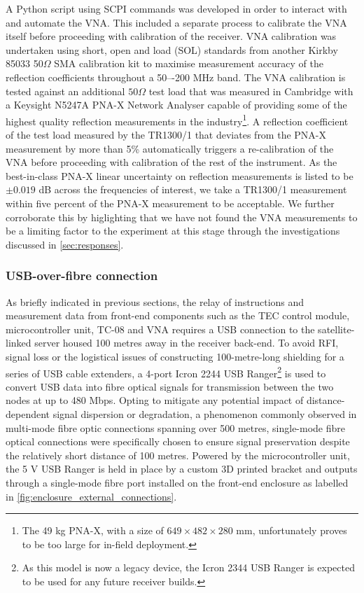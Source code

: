 A Python script using SCPI commands was developed in order to interact with and automate the VNA. This included a separate process to calibrate the VNA itself before proceeding with calibration of the receiver. VNA calibration was undertaken using short, open and load (SOL) standards from another Kirkby 85033 50$\Omega$ SMA calibration kit to maximise measurement accuracy of the reflection coefficients throughout a 50–-200 MHz band. The VNA calibration is tested against an additional $50\Omega$ test load that was measured in Cambridge with a Keysight N5247A PNA-X Network Analyser capable of providing some of the highest quality reflection measurements in the industry\footnote{The 49 kg PNA-X, with a size of $649 \times 482 \times 280$ mm, unfortunately proves to be too large for in-field deployment.}. A reflection coefficient of the test load measured by the TR1300/1 that deviates from the PNA-X measurement by more than 5\% automatically triggers a re-calibration of the VNA before proceeding with calibration of the rest of the instrument. As the best-in-class PNA-X linear uncertainty on reflection measurements is listed to be $\pm 0.019$ dB across the frequencies of interest, we take a TR1300/1 measurement within five percent of the PNA-X measurement to be acceptable. We further corroborate this by higlighting that we have not found the VNA measurements to be a limiting factor to the experiment at this stage through the investigations discussed in \cref{sec:responses}.


\subsubsection{USB-over-fibre connection}
As briefly indicated in previous sections, the relay of instructions and measurement data from front-end components such as the TEC control module, microcontroller unit, TC-08 and VNA requires a USB connection to the satellite-linked server housed 100 metres away in the receiver back-end. To avoid RFI, signal loss or the logistical issues of constructing 100-metre-long shielding for a series of USB cable extenders, a 4-port Icron 2244 USB Ranger\footnote{As this model is now a legacy device, the Icron 2344 USB Ranger is expected to be used for any future receiver builds.} is used to convert USB data into fibre optical signals for transmission between the two nodes at up to 480 Mbps. Opting to mitigate any potential impact of distance-dependent signal dispersion or degradation, a phenomenon commonly observed in multi-mode fibre optic connections spanning over 500 metres, single-mode fibre optical connections were specifically chosen to ensure signal preservation despite the relatively short distance of 100 metres. Powered by the microcontroller unit, the 5 V USB Ranger is held in place by a custom 3D printed bracket and outputs through a single-mode fibre port installed on the front-end enclosure as labelled in \cref{fig:enclosure_external_connections}.


